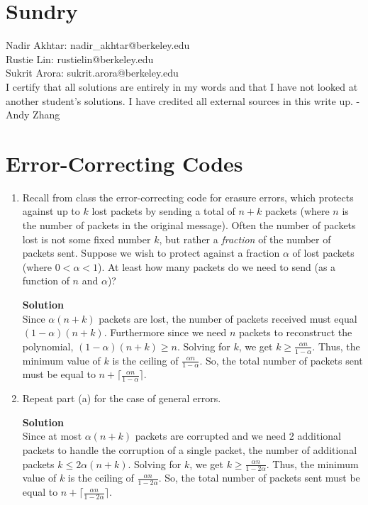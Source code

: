 \documentclass[11pt]{article}
\newcommand*{\Question}[1]{\section{#1}}
\newenvironment{Parts}{\begin{enumerate}[label=(\alph*)]}{\end{enumerate}}
\newcommand*{\Part}{\item}
\newenvironment{Answer}{\vspace{10pt}\begin{mdframed}\textbf{Solution}\\}{\end{mdframed}\vfill\pagebreak[3]}
\newenvironment{Answer}{\vspace{10pt}}{\vfill\pagebreak[3]}
\begin{document}
\Question{Sundry} 
\vspace{10pt}
\noindent Nadir Akhtar: nadir\_akhtar@berkeley.edu\\
Rustie Lin: rustielin@berkeley.edu\\
Sukrit Arora: sukrit.arora@berkeley.edu\\

I certify that all solutions are entirely in my words and that I have not looked at another student’s
solutions. I have credited all external sources in this write up. - Andy Zhang
\vfill\pagebreak[3]

\Question{Error-Correcting Codes}

\begin{Parts}
\renewcommand{\labelenumi}{(\alph{enumi})}
    \Part
    Recall from class the error-correcting code for erasure errors, which
    protects against up to $k$ lost packets by sending a total of $n+k$ packets
    (where $n$ is the number of packets in the original message).  Often the number
    of packets lost is not some fixed number $k$, but rather a \emph{fraction} of
    the number of packets sent.  Suppose we wish to protect against a fraction
    $\alpha$ of lost packets (where $0 < \alpha < 1$).  At least how many packets do 
    we need to send (as a function of $n$ and $\alpha$)?
    \begin{Answer}
        Since $\alpha (n+k)$ packets are lost, the number of packets received must equal $(1-\alpha)(n+k)$. Furthermore since we need $n$ packets to reconstruct the polynomial, $(1-\alpha)(n+k) \geq n$. Solving for $k$, we get $k \geq \frac{\alpha n}{1-\alpha}$. Thus, the minimum value of $k$ is the ceiling of $\frac{\alpha n}{1-\alpha}$. So, the total number of packets sent must be equal to $n+\lceil \frac{\alpha n}{1-\alpha} \rceil$.
    \end{Answer}
    \Part
    Repeat part (a) for the case of general errors.
    \begin{Answer}
        Since at most $\alpha (n+k)$ packets are corrupted and we need 2 additional packets to handle the corruption of a single packet, the number of additional packets $k \leq 2 \alpha (n+k)$. Solving for $k$, we get $k \geq \frac{\alpha n}{1-2\alpha}$. Thus, the minimum value of $k$ is the ceiling of $\frac{\alpha n}{1-2\alpha}$. So, the total number of packets sent must be equal to $n+\lceil \frac{\alpha n}{1-2\alpha} \rceil$.
    \end{Answer}
\end{Parts}
\end{document}
